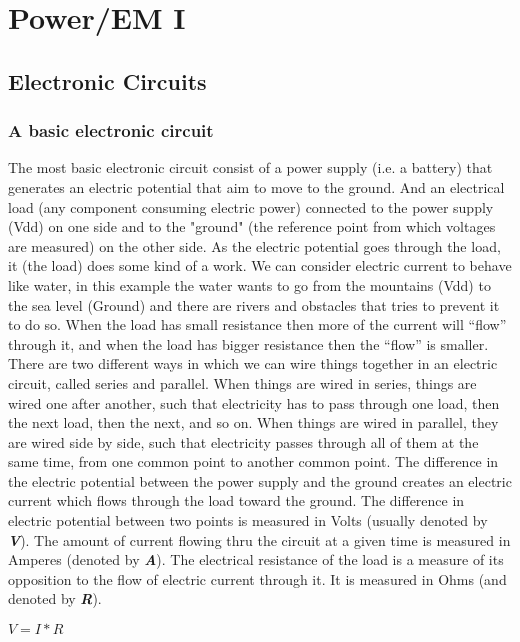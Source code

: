 \chapter{Power/EM I} \label{c4_forthchapter:cha}
\section{Electronic Circuits}
\subsection{A basic electronic circuit}
The most basic electronic circuit consist of a power supply (i.e. a battery) that generates an electric potential that aim to move to the ground. And an electrical load (any component consuming electric power) connected to the power supply (Vdd) on one side and to the "ground" (the reference point from which voltages are measured) on the other side. As the electric potential goes through the load, it (the load) does some kind of a work. We can consider electric current to behave like water, in this example the water wants to go from the mountains (Vdd) to the sea level (Ground) and there are rivers and obstacles that tries to prevent it to do so. When the load has small resistance then more of the current will “flow” through it, and when the load has bigger resistance then the “flow” is smaller.  
There are two different ways in which we can wire things together in an electric circuit, called series and parallel.
When things are wired in series, things are wired one after another, such that electricity has to pass through one load, then the next load, then the next, and so on.
When things are wired in parallel, they are wired side by side, such that electricity passes through all of them at the same time, from one common point to another common point.
The difference in the electric potential between the power supply and the ground creates an electric current which flows through the load toward the ground.
The difference in electric potential between two points is measured in Volts (usually denoted by \textbf{\textit{V}}). The amount of current flowing thru the circuit at a given time is measured in Amperes (denoted by \textbf{\textit{A}}).
The electrical resistance of the load is a measure of its opposition to the flow of electric current through it. It is measured in Ohms (and denoted by \textbf{\textit{R}}).

$V=I*R$
